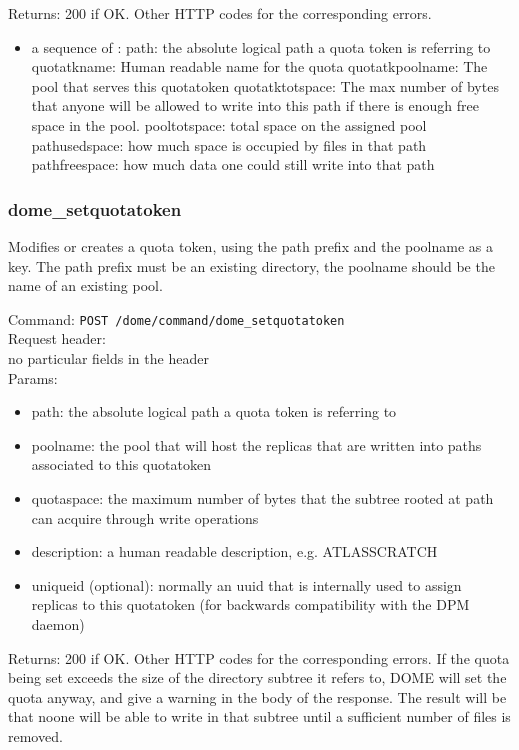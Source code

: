 \documentclass[a4paper,10pt]{scrreprt}
\begin{document}
Returns: 200 if OK. Other HTTP codes for the corresponding errors.\\
\begin{itemize}
 \item a sequence of :
 \subitem path: the absolute logical path a quota token is referring to
 \subitem quotatkname: Human readable name for the quota
 \subitem quotatkpoolname: The pool that serves this quotatoken
 \subitem quotatktotspace: The max number of bytes that anyone will
 be allowed to write into this path if there is enough free space in the pool.
 \subitem pooltotspace: total space on the assigned pool
 \subitem pathusedspace: how much space is occupied by files in that path
 \subitem pathfreespace: how much data one could still write into that path
\end{itemize}

\subsubsection{dome\_setquotatoken}
Modifies or creates a quota token, using the path prefix and the poolname as a key. The path prefix must be an existing directory, the poolname should be the name of an existing pool.

Command:
\lstinline"POST /dome/command/dome_setquotatoken"\\

Request header:\\
 no particular fields in the header\\

Params:
\begin{itemize}
 \item path: the absolute logical path a quota token is referring to
 \item poolname: the pool that will host the replicas that are written into paths associated to this quotatoken
 \item quotaspace: the maximum number of bytes that the subtree rooted at path can acquire through write operations
 \item description: a human readable description, e.g. ATLASSCRATCH
 \item uniqueid (optional): normally an uuid that is internally used to assign replicas to this quotatoken (for backwards compatibility with the DPM daemon)
\end{itemize}

Returns: 200 if OK. Other HTTP codes for the corresponding errors. If the quota being set exceeds the size of the directory subtree it refers to, DOME will set the quota anyway, and give a warning in the body of the response. The result will be that noone will be able to write in that subtree until a sufficient number of files is removed.\\
\end{document}
